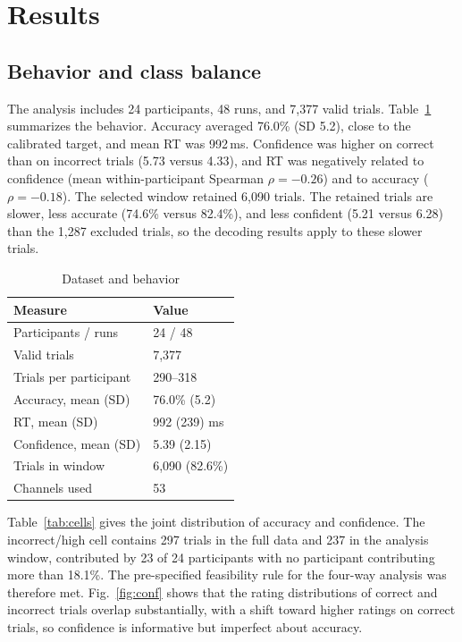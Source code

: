 \documentclass[11pt,a4paper]{article}
\begin{document}
\section{Results}

\subsection{Behavior and class balance}
\label{sec:behavior}

The analysis includes 24 participants, 48 runs, and 7,377 valid trials. Table~\ref{tab:behavior} summarizes the behavior. Accuracy averaged 76.0\% (SD 5.2), close to the calibrated target, and mean RT was 992\,ms. Confidence was higher on correct than on incorrect trials (5.73 versus 4.33), and RT was negatively related to confidence (mean within-participant Spearman $\rho=-0.26$) and to accuracy ($\rho=-0.18$). The selected window retained 6,090 trials. The retained trials are slower, less accurate (74.6\% versus 82.4\%), and less confident (5.21 versus 6.28) than the 1,287 excluded trials, so the decoding results apply to these slower trials.

\begin{table}[ht]
\centering
\caption{Dataset and behavior}
\label{tab:behavior}
\small
\begin{tabular}{@{}ll@{}}
\toprule
\textbf{Measure} & \textbf{Value}\\
\midrule
Participants / runs & 24 / 48\\
Valid trials & 7,377\\
Trials per participant & 290--318\\
Accuracy, mean (SD) & 76.0\% (5.2)\\
RT, mean (SD) & 992 (239) ms\\
Confidence, mean (SD) & 5.39 (2.15)\\
Trials in window & 6,090 (82.6\%)\\
Channels used & 53\\
\bottomrule
\end{tabular}
\end{table}

Table~\ref{tab:cells} gives the joint distribution of accuracy and confidence. The incorrect/high cell contains 297 trials in the full data and 237 in the analysis window, contributed by 23 of 24 participants with no participant contributing more than 18.1\%. The pre-specified feasibility rule for the four-way analysis was therefore met. Fig.~\ref{fig:conf} shows that the rating distributions of correct and incorrect trials overlap substantially, with a shift toward higher ratings on correct trials, so confidence is informative but imperfect about accuracy.
\end{document}
